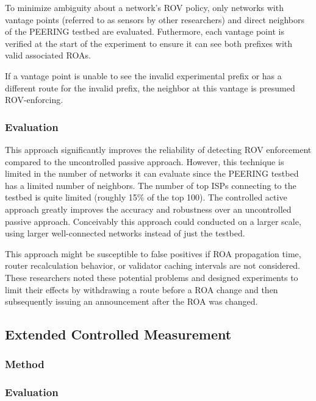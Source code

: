 \documentclass[sigconf]{acmart}
\begin{document}
To minimize ambiguity about a network's ROV policy, only networks with
vantage points (referred to as sensors by other researchers) and direct
neighbors of the PEERING testbed are evaluated.  Futhermore, each
vantage point is verified at the start of the experiment to ensure it
can see both prefixes with valid associated ROAs.

If a vantage point is unable to see the invalid experimental prefix or
has a different route for the invalid prefix, the neighbor at this
vantage is presumed ROV-enforcing.

\subsubsection{Evaluation}

This approach significantly improves the reliability of detecting ROV
enforcement compared to the uncontrolled passive approach.  However,
this technique is limited in the number of networks it can evaluate
since the PEERING testbed has a limited number of neighbors. The number
of top ISPs connecting to the testbed is quite limited (roughly 15\% of
the top 100).  The controlled active approach greatly improves the
accuracy and robustness over an uncontrolled passive approach.
Conceivably this approach could conducted on a larger scale, using
larger well-connected networks instead of just the testbed.

This approach might be susceptible to false positives if ROA propagation
time, router recalculation behavior, or validator caching intervals are
not considered.  These researchers noted these potential problems and
designed experiments to limit their effects by withdrawing a route
before a ROA change and then subsequently issuing an announcement
after the ROA was changed.


\subsection{Extended Controlled Measurement}

\subsubsection{Method}
\subsubsection{Evaluation}
\end{document}
